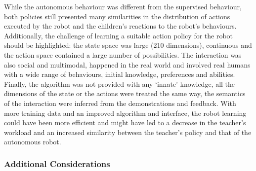 While the autonomous behaviour was different from the supervised behaviour, both policies still presented many similarities in the distribution of actions executed by the robot and the children's reactions to the robot's behaviours. Additionally, the challenge of learning a suitable action policy for the robot should be highlighted: the state space was large (210 dimensions), continuous and the action space contained a large number of possibilities. The interaction was also social and multimodal, happened in the real world and involved real humans with a wide range of behaviours, initial knowledge, preferences and abilities. Finally, the algorithm was not provided with any `innate' knowledge, all the dimensions of the state or the actions were treated the same way, the semantics of the interaction were inferred from the demonstrations and feedback. With more training data and an improved algorithm and interface, the robot learning could have been more efficient and might have led to a decrease in the teacher's workload and an increased similarity between the teacher's policy and that of the autonomous robot. 

\subsubsection{Additional Considerations}


